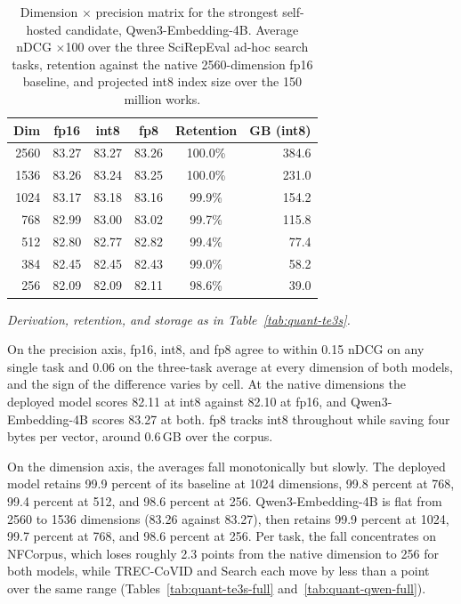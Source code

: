 \begin{table}[t]
\caption{Dimension $\times$ precision matrix for the strongest self-hosted candidate, Qwen3-Embedding-4B. Average nDCG $\times$100 over the three SciRepEval ad-hoc search tasks, retention against the native 2560-dimension fp16 baseline, and projected int8 index size over the 150 million works.}
\label{tab:quant-qwen}
\centering
\footnotesize
\begin{tabular}{@{}rccccr@{}}
\toprule
Dim & fp16 & int8 & fp8 & Retention & GB (int8) \\
\midrule
2560 & 83.27 & 83.27 & 83.26 & 100.0\% & 384.6 \\
1536 & 83.26 & 83.24 & 83.25 & 100.0\% & 231.0 \\
1024 & 83.17 & 83.18 & 83.16 & 99.9\%  & 154.2 \\
768  & 82.99 & 83.00 & 83.02 & 99.7\%  & 115.8 \\
512  & 82.80 & 82.77 & 82.82 & 99.4\%  & 77.4  \\
384  & 82.45 & 82.45 & 82.43 & 99.0\%  & 58.2  \\
256  & 82.09 & 82.09 & 82.11 & 98.6\%  & 39.0  \\
\bottomrule
\end{tabular}

\vspace{3pt}
\begin{minipage}{\linewidth}
\footnotesize\itshape
Derivation, retention, and storage as in Table~\ref{tab:quant-te3s}.
\end{minipage}
\end{table}

On the precision axis, fp16, int8, and fp8 agree to within 0.15 nDCG on any single task and 0.06 on the three-task average at every dimension of both models, and the sign of the difference varies by cell. At the native dimensions the deployed model scores 82.11 at int8 against 82.10 at fp16, and Qwen3-Embedding-4B scores 83.27 at both. fp8 tracks int8 throughout while saving four bytes per vector, around 0.6\,GB over the corpus.

On the dimension axis, the averages fall monotonically but slowly. The deployed model retains 99.9 percent of its baseline at 1024 dimensions, 99.8 percent at 768, 99.4 percent at 512, and 98.6 percent at 256. Qwen3-Embedding-4B is flat from 2560 to 1536 dimensions (83.26 against 83.27), then retains 99.9 percent at 1024, 99.7 percent at 768, and 98.6 percent at 256. Per task, the fall concentrates on NFCorpus, which loses roughly 2.3 points from the native dimension to 256 for both models, while TREC-CoVID and Search each move by less than a point over the same range (Tables~\ref{tab:quant-te3s-full} and~\ref{tab:quant-qwen-full}).

